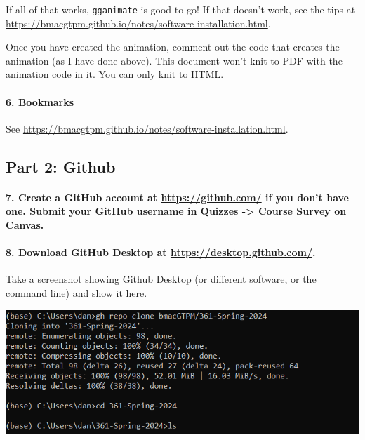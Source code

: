 \documentclass[
]{article}
\begin{document}
If all of that works, \texttt{gganimate} is good to go! If that doesn't
work, see the tips at
\url{https://bmacgtpm.github.io/notes/software-installation.html}.

Once you have created the animation, comment out the code that creates
the animation (as I have done above). This document won't knit to PDF
with the animation code in it. You can only knit to HTML.

\paragraph{6. Bookmarks}\label{bookmarks}

See \url{https://bmacgtpm.github.io/notes/software-installation.html}.

\subsection{Part 2: Github}\label{part-2-github}

\paragraph{\texorpdfstring{7. Create a GitHub account at
\url{https://github.com/} if you don't have one. Submit your GitHub
username in Quizzes -\textgreater{} Course Survey on
Canvas.}{7. Create a GitHub account at https://github.com/ if you don't have one. Submit your GitHub username in Quizzes -\textgreater{} Course Survey on Canvas.}}\label{create-a-github-account-at-httpsgithub.com-if-you-dont-have-one.-submit-your-github-username-in-quizzes---course-survey-on-canvas.}

\paragraph{\texorpdfstring{8. Download GitHub Desktop at
\url{https://desktop.github.com/}.}{8. Download GitHub Desktop at https://desktop.github.com/.}}\label{download-github-desktop-at-httpsdesktop.github.com.}

Take a screenshot showing Github Desktop (or different software, or the
command line) and show it here.

\includegraphics{img/github ss.png}
\end{document}
